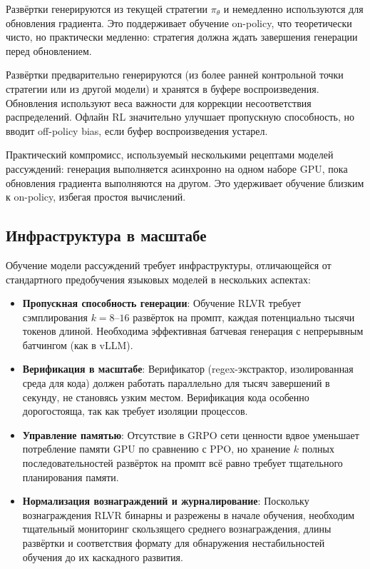 \begin{description}[leftmargin=!,labelwidth=3.5cm]
\item[Онлайн RL] Развёртки генерируются из текущей стратегии
  $\pi_\theta$ и немедленно используются для обновления градиента. Это поддерживает
  обучение on-policy, что теоретически чисто,
  но практически медленно: стратегия должна ждать завершения генерации
  перед обновлением.

\item[Офлайн RL] Развёртки предварительно генерируются (из более ранней
  контрольной точки стратегии или из другой модели) и хранятся в
  буфере воспроизведения. Обновления используют веса важности для коррекции
  несоответствия распределений. Офлайн RL значительно улучшает
  пропускную способность, но вводит off-policy bias, если буфер воспроизведения устарел.

\item[Асинхронный RL] Практический компромисс, используемый несколькими
  рецептами моделей рассуждений: генерация выполняется асинхронно на одном наборе
  GPU, пока обновления градиента выполняются на другом. Это удерживает
  обучение близким к on-policy, избегая простоя вычислений.
\end{description}

\subsection{Инфраструктура в масштабе}
\label{subsec:infra}

Обучение модели рассуждений требует инфраструктуры, отличающейся от
стандартного предобучения языковых моделей в нескольких аспектах:

\begin{itemize}[leftmargin=*]
\item \textbf{Пропускная способность генерации}: Обучение RLVR требует сэмплирования
  $k = 8$--$16$ развёрток на промпт, каждая потенциально тысячи
  токенов длиной. Необходима эффективная батчевая генерация с непрерывным батчингом
  (как в vLLM).

\item \textbf{Верификация в масштабе}: Верификатор (regex-экстрактор,
  изолированная среда для кода) должен работать параллельно для тысяч завершений в
  секунду, не становясь узким местом. Верификация кода
  особенно дорогостояща, так как требует изоляции процессов.

\item \textbf{Управление памятью}: Отсутствие в GRPO сети ценности
  вдвое уменьшает потребление памяти GPU по сравнению с PPO, но хранение
  $k$ полных последовательностей развёрток на промпт всё равно требует тщательного планирования памяти.

\item \textbf{Нормализация вознаграждений и журналирование}: Поскольку вознаграждения RLVR
  бинарны и разрежены в начале обучения, необходим тщательный мониторинг
  скользящего среднего вознаграждения, длины развёртки и соответствия формату
  для обнаружения нестабильностей обучения до их каскадного развития.
\end{itemize}

